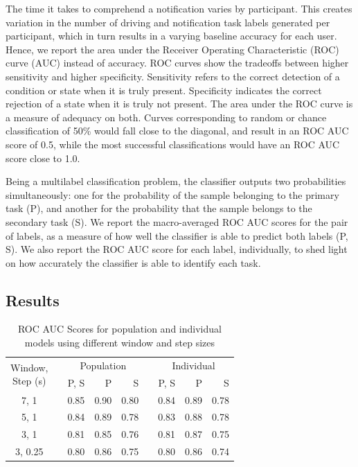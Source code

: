 The time it takes to comprehend a notification varies by participant. This creates variation in the number of driving and notification task labels generated per participant, which in turn results in a varying baseline accuracy for each user. Hence, we report the area under  the Receiver Operating Characteristic (ROC) curve (AUC) instead of accuracy. ROC curves show the tradeoffs between higher sensitivity and higher specificity. Sensitivity refers to the correct detection of a condition or state when it is truly present. Specificity indicates the correct rejection of a state when it is truly not present. The area under the ROC curve is a measure of adequacy on both. Curves corresponding to random or chance classification of 50\% would fall close to the diagonal, and result in an ROC AUC score of 0.5, while the most successful classifications would have an ROC AUC score close to 1.0. 

Being a multilabel classification problem, the classifier outputs two probabilities simultaneously: one for the probability of the sample belonging to the primary task (P), and another for the probability that the sample belongs to the secondary task (S). We report the macro-averaged ROC AUC scores for the pair of labels, as a measure of how well the classifier is able to predict both labels (P, S). We also report the ROC AUC score for each label, individually, to shed light on how accurately the classifier is able to identify each task.

\subsection{Results}

\renewcommand{\arraystretch}{1.2}
\begin{table}[t]
\centering
\begin{tabular} {@{}ccrrrcrrr@{}}\toprule
\multirow{2}{*}{\parbox[c]{1.3cm}{\centering Window,\\Step (s)}} & \phantom{}
&  \multicolumn{3}{c}{Population} & \phantom{} & \multicolumn{3}{c}{Individual} \\
\cmidrule{3-5} \cmidrule{7-9}
 && P, S & P & S && P, S & P & S\\
\midrule
7, 1 && 0.85 & 0.90 & 0.80 && 0.84 & 0.89 & 0.78 \\
5, 1 && 0.84 & 0.89 & 0.78 && 0.83 & 0.88 & 0.78 \\
3, 1 && 0.81 & 0.85 & 0.76 && 0.81 & 0.87 & 0.75 \\
3, 0.25 && 0.80 & 0.86 & 0.75 && 0.80 & 0.86 & 0.74 \\
\bottomrule
\end{tabular}
\caption{ROC AUC Scores for population and individual models using different window and step sizes}
\label{Tab:win}
\end{table}

